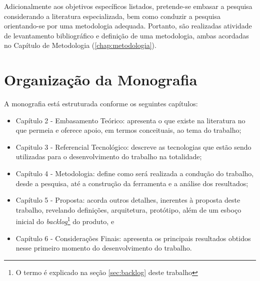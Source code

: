Adicionalmente aos objetivos específicos listados, pretende-se embasar a pesquisa considerando a literatura especializada, bem como conduzir a pesquisa orientando-se por uma metodologia adequada. Portanto, são realizadas atividade de levantamento bibliográfico e definição de uma metodologia, ambas acordadas no Capítulo de Metodologia (\ref{chap:metodologia}).


\section{Organização da Monografia}

\label{ref:organizacao}

A monografia está estruturada conforme os seguintes capítulos:

\begin{itemize}
    \item Capítulo 2 - Embasamento Teórico: apresenta o que existe na literatura no que permeia e oferece apoio, em termos conceituais, ao tema do trabalho;
    \item Capitulo 3 - Referencial Tecnológico: descreve as tecnologias que estão sendo utilizadas para o desenvolvimento do trabalho na totalidade;
    \item Capítulo 4 - Metodologia: define como será realizada a condução do trabalho, desde a pesquisa, até a construção da ferramenta e a análise dos resultados;
    \item Capítulo 5 - Proposta: acorda outros detalhes, inerentes à proposta deste trabalho, revelando definições, arquitetura, protótipo, além de um esboço inicial do \textit{backlog}\footnote{O termo é explicado na seção \ref{sec:backlog} deste trabalho} do produto, e
    \item Capítulo 6 - Considerações Finais: apresenta os principais resultados obtidos nesse primeiro momento do desenvolvimento do trabalho.
\end{itemize}